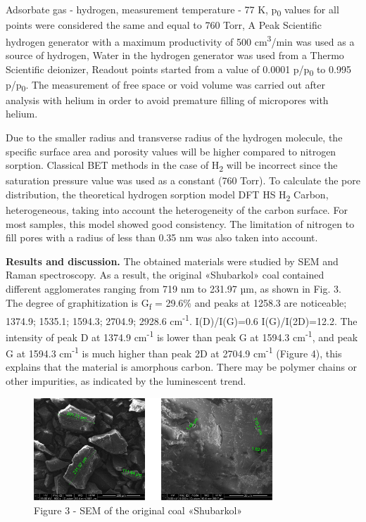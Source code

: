 \begin{multicols}{2}
Adsorbate gas - hydrogen, measurement temperature - 77 K,
p\textsubscript{0} values \hspace{0pt}\hspace{0pt}for all points were
considered the same and equal to 760 Torr, A Peak Scientific hydrogen
generator with a maximum productivity of 500 cm\textsuperscript{3}/min
was used as a source of hydrogen, Water in the hydrogen generator was
used from a Thermo Scientific deionizer, Readout points started from a
value of 0.0001 p/p\textsubscript{0} to 0.995 p/p\textsubscript{0}. The
measurement of free space or void volume was carried out after analysis
with helium in order to avoid premature filling of micropores with
helium.

Due to the smaller radius and transverse radius of the hydrogen
molecule, the specific surface area and porosity values
\hspace{0pt}\hspace{0pt}will be higher compared to nitrogen sorption.
Classical BET methods in the case of H\textsubscript{2} will be
incorrect since the saturation pressure value was used as a constant
(760 Torr). To calculate the pore distribution, the theoretical hydrogen
sorption model DFT HS H\textsubscript{2} Carbon, heterogeneous, taking
into account the heterogeneity of the carbon surface. For most samples,
this model showed good consistency. The limitation of nitrogen to fill
pores with a radius of less than 0.35 nm was also taken into account.

{\bfseries Results and discussion.} The obtained materials were studied by
SEM and Raman spectroscopy. As a result, the original «Shubarkol» coal
contained different agglomerates ranging from 719 nm to 231.97 µm, as
shown in Fig. 3. The degree of graphitization is G\textsubscript{f} =
29.6\% and peaks at 1258.3 are noticeable; 1374.9; 1535.1; 1594.3;
2704.9; 2928.6 cm\textsuperscript{-1}. I(D)/I(G)=0.6 I(G)/I(2D)=12.2.
The intensity of peak D at 1374.9 cm\textsuperscript{-1} is lower than
peak G at 1594.3 cm\textsuperscript{-1}, and peak G at 1594.3
cm\textsuperscript{-1} is much higher than peak 2D at 2704.9
cm\textsuperscript{-1} (Figure 4), this explains that the material is
amorphous carbon. There may be polymer chains or other impurities, as
indicated by the luminescent trend.
\end{multicols}

\begin{figure}[H]
	\centering
	\includegraphics[width=0.8\textwidth]{assets/55}
	\caption*{Figure 3 - SEM of the original coal «Shubarkol»}
\end{figure}

